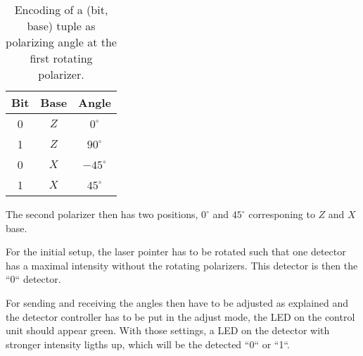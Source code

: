 \begin{table}
  \centering
  \caption{Encoding of a (bit, base) tuple as polarizing angle at the first rotating polarizer.}
  \label{tab:bit-encoding}
  \begin{tabular}{c c c}
    Bit & Base & Angle \\
    \hline
    0 & $Z$ & $0^\circ$ \\
    1 & $Z$ & $90^\circ$ \\
    0 & $X$ & $-45^\circ$ \\
    1 & $X$ & $45^\circ$ \\
  \end{tabular}
\end{table}

The second polarizer then has two positions, $0^\circ$ and $45^\circ$ corresponing to $Z$ and $X$
base. 

For the initial setup, the laser pointer has to be rotated such that one detector has a maximal
intensity without the rotating polarizers. This detector is then the ``0`` detector.

For sending and receiving the angles then have to be adjusted as explained and the detector
controller has to be put in the adjust mode, the LED on the control unit should appear green. With
those settings, a LED on the detector with stronger intensity ligths up, which will be the detected
``0`` or ``1``.
